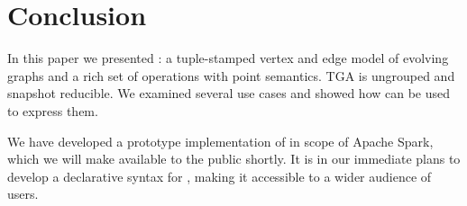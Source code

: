 \section{Conclusion}
\label{sec:conc}

In this paper we presented \tga: a tuple-stamped vertex and edge model
of evolving graphs and a rich set of operations with point semantics.
TGA is ungrouped and snapshot reducible.  We examined several use
cases and showed how \tga can be used to express them.

We have developed a prototype implementation of \tga in scope of
Apache Spark, which we will make available to the public shortly.  It
is in our immediate plans to develop a declarative syntax for \tga,
making it accessible to a wider audience of users.
